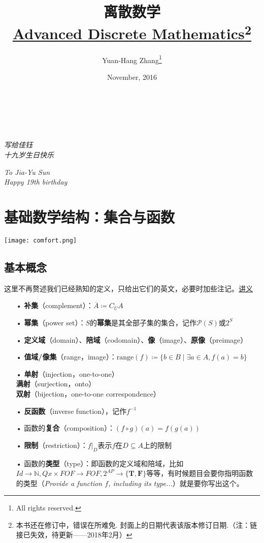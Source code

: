 \documentclass[b5paper,oneside]{ctexbook}
\title{\textbf{离散数学}\\\href{http://learningtolearn.me/books/advanced_discrete}{Advanced Discrete Mathematics}\footnote{本书还在修订中，错误在所难免. 封面上的日期代表该版本修订日期.（注：链接已失效，待更新——2018年2月）}}
\date{November, 2016}
\author{Yuan-Hang Zhang\footnote{\textcopyright{} All rights reserved.}}
\begin{document}
\maketitle
\chapter*{\ }
\thispagestyle{empty}
    \null{}
        \begin{flushright}
               \large \emph{写给佳钰\\十九岁生日快乐}

\large \emph{To Jia-Yu Sun\\Happy 19th birthday}
        \end{flushright}
\null

\tableofcontents
\chapter{基础数学结构：集合与函数}
\vspace*{\fill}
\begin{center}
\texttt{[image: comfort.png]}
\end{center}
\vspace*{\fill}
\clearpage
\section{基本概念}
这里不再赘述我们已经熟知的定义，只给出它们的英文，必要时加些注记。\href{http://iscasmc.ios.ac.cn/DM2016/annotated2.pdf}{讲义}

\begin{enumerate}
\item[•]\textbf{补集}（complement）：$\overline{A}\coloneqq C_UA$
\item[•]\textbf{幂集}（power set）：$S$的\textbf{幂集}是其全部子集的集合，记作$\mathcal{P}(S)$或$2^S$
\item[•]\textbf{定义域}（domain）、\textbf{陪域}（codomain）、\textbf{像}（image）、\textbf{原像}（preimage）
\item[•]\textbf{值域/像集}（range，image）：$\mathrm{range}(f)\coloneqq\{b\in B\mid\exists a\in A,f(a)=b\}$
\item[•]\textbf{单射}（injection，one-to-one）\\\textbf{满射}（surjection，onto）\\\textbf{双射}（bijection，one-to-one correspondence）
\item[•]\textbf{\textbf{反函数}}（inverse function），记作$f^{-1}$
\item[•]函数的\textbf{复合}（composition）：$(f\circ g)(a)=f(g(a))$
\item[•]\textbf{限制}（restriction）：$f|_D$表示$f$在$D\subseteq A$上的限制
\item[•]函数的\textbf{类型}（type）：即函数的定义域和陪域，比如$Id\to\mathbb{N},Qx\times FOF\to FOF ,2^{AP}\to\{\mathbf{T},\mathbf{F}\}$等等，有时候题目会要你指明函数的类型（\emph{Provide a function $f$, including its type...}）就是要你写出这个。
\end{enumerate}
\end{document}
